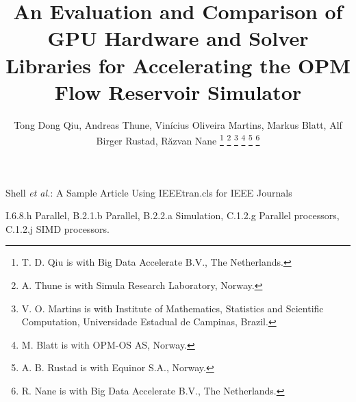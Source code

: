 \documentclass[journal]{IEEEtran}
\begin{document}
\title{An Evaluation and Comparison of GPU Hardware and Solver Libraries for Accelerating the OPM Flow Reservoir Simulator}

\author{Tong Dong Qiu, Andreas Thune, Vinícius Oliveira Martins, Markus Blatt, Alf Birger Rustad, R\u{a}zvan Nane
	\thanks{T. D. Qiu is with Big Data Accelerate B.V., The Netherlands.}
	\thanks{A. Thune is with Simula Research Laboratory, Norway.}
	\thanks{V. O. Martins is with Institute of Mathematics, Statistics and Scientific Computation, Universidade Estadual de Campinas, Brazil.}
	\thanks{M. Blatt is with OPM-OS AS, Norway.}
	\thanks{A. B. Rustad is with Equinor S.A., Norway.}
	\thanks{R. Nane is with Big Data Accelerate B.V., The Netherlands.}
}


%
{Shell \MakeLowercase{\textit{et al.}}: A Sample Article Using IEEEtran.cls for IEEE Journals}


\maketitle

\begin{abstract}
	
\end{abstract}

\begin{IEEEkeywords}
	I.6.8.h Parallel, B.2.1.b Parallel, B.2.2.a Simulation, C.1.2.g Parallel processors, C.1.2.j SIMD processors.
\end{IEEEkeywords}



\newpage


%












\vfill
\end{document}
